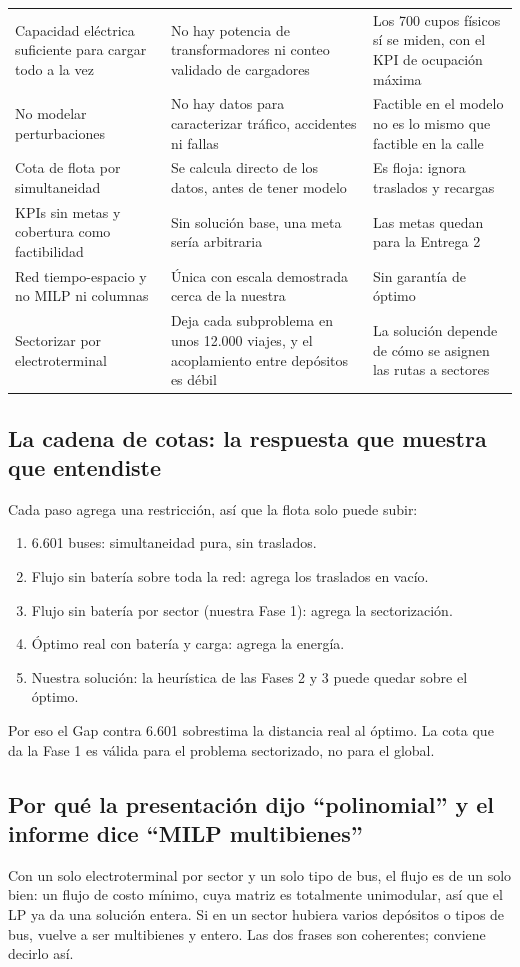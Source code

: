\documentclass[11pt,a4paper,parskip=half]{scrartcl}
\begin{document}
\begin{longtable}{@{}L{4.0cm}L{6.0cm}L{5.6cm}@{}}
Capacidad eléctrica suficiente para cargar todo a la vez & No hay potencia de transformadores ni conteo validado de cargadores & Los 700 cupos físicos sí se miden, con el KPI de ocupación máxima \\
No modelar perturbaciones & No hay datos para caracterizar tráfico, accidentes ni fallas & Factible en el modelo no es lo mismo que factible en la calle \\
Cota de flota por simultaneidad & Se calcula directo de los datos, antes de tener modelo & Es floja: ignora traslados y recargas \\
KPIs sin metas y cobertura como factibilidad & Sin solución base, una meta sería arbitraria & Las metas quedan para la Entrega 2 \\
Red tiempo-espacio y no MILP ni columnas & Única con escala demostrada cerca de la nuestra & Sin garantía de óptimo \\
Sectorizar por electroterminal & Deja cada subproblema en unos 12.000 viajes, y el acoplamiento entre depósitos es débil & La solución depende de cómo se asignen las rutas a sectores \\
\end{longtable}
\endgroup

\subsection*{La cadena de cotas: la respuesta que muestra que entendiste}
Cada paso agrega una restricción, así que la flota solo puede subir:
\begin{enumerate}
  \item 6.601 buses: simultaneidad pura, sin traslados.
  \item Flujo sin batería sobre toda la red: agrega los traslados en vacío.
  \item Flujo sin batería por sector (nuestra Fase 1): agrega la sectorización.
  \item Óptimo real con batería y carga: agrega la energía.
  \item Nuestra solución: la heurística de las Fases 2 y 3 puede quedar sobre el óptimo.
\end{enumerate}
Por eso el Gap contra 6.601 sobrestima la distancia real al óptimo. La cota que da la Fase 1 es válida para el problema sectorizado, no para el global.

\subsection*{Por qué la presentación dijo ``polinomial'' y el informe dice ``MILP multibienes''}
Con un solo electroterminal por sector y un solo tipo de bus, el flujo es de un solo bien: un flujo de costo mínimo, cuya matriz es totalmente unimodular, así que el LP ya da una solución entera. Si en un sector hubiera varios depósitos o tipos de bus, vuelve a ser multibienes y entero. Las dos frases son coherentes; conviene decirlo así.
\end{document}
